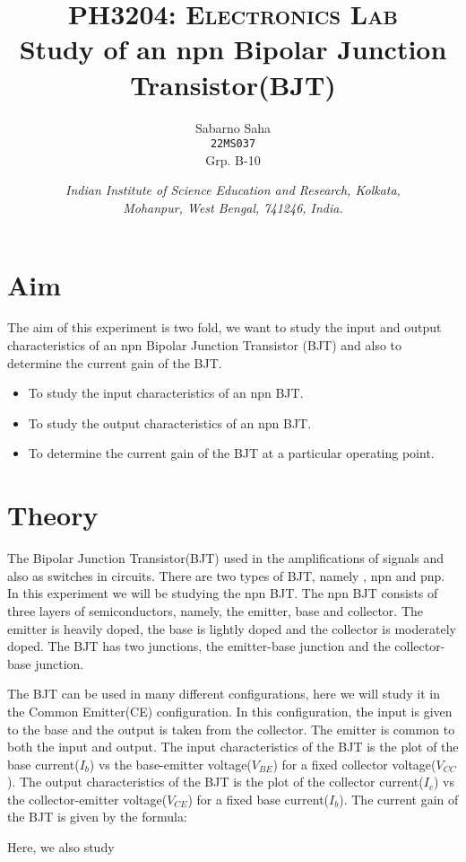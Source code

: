 \documentclass{scrartcl}
\title{
        \Large\textsc{PH3204: Electronics Lab} \\
        \vspace{10pt}
        \Huge \textbf{Study of an npn Bipolar Junction Transistor(BJT)} \\
}
\author{Sabarno Saha \\ \texttt{22MS037} \\ Grp. B-10}
\date{\normalsize
        \textit{Indian Institute of Science Education and Research, Kolkata, \\
        Mohanpur, West Bengal, 741246, India.}
}
\newcommand{\1}{\mathbbm{1}}
\begin{document}
\maketitle
\tableofcontents
\newpage
\section{Aim}

The aim of this experiment is two fold, we want to study the input and output characteristics of an npn
Bipolar Junction Transistor (BJT) and also to determine the current gain of the BJT.

\begin{itemize}
	\item To study the input characteristics of an npn BJT.
	\item To study the output characteristics of an npn BJT.
	\item To determine the current gain of the BJT at a particular operating point.
\end{itemize}



\section{Theory}
The Bipolar Junction Transistor(BJT) used in the amplifications of signals and also as switches in circuits. There are two types of BJT, namely , npn and pnp. In this experiment we will be studying the npn BJT.
 The npn BJT consists of three layers of semiconductors, namely, the emitter, base and collector. The emitter is heavily doped, the base is lightly doped and the collector is moderately doped. 
 The BJT has two junctions, the emitter-base junction and the collector-base junction. 

The BJT can be used in many different configurations, here we will study it in the Common Emitter(CE) configuration. In this configuration, the input is given to the base and the output is taken from the collector. 
The emitter is common to both the input and output. 
The input characteristics of the BJT is the plot of the base current($I_b$) vs the base-emitter voltage($V_{BE}$) for a fixed collector voltage($V_{CC}$). 
The output characteristics of the BJT is the plot of the collector current($I_c$) vs the collector-emitter voltage($V_{CE}$) for a fixed base current($I_b$). The current gain of the BJT is given by the formula:

Here, we also study 
\end{document}
